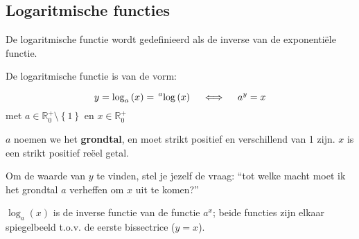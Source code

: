 

\subsection{Logaritmische functies}


\begin{definitie}
	De logaritmische functie wordt gedefinieerd als de inverse
van de exponenti\"ele functie.

De logaritmische functie is van de vorm:

\begin{equation}
 y=\log_{a}\left(x\right)=\sideset{^{a}}{\left(x\right)}\log\quad\iff\quad a^{y}=x
\end{equation}
met $a\in\mathbb{R}_{0}^{+}\setminus\left\{ 1\right\}$
en $x\in\mathbb{R}_{0}^{+}$

$a$ noemen we het \textbf{grondtal}, en moet strikt positief
en verschillend van 1 zijn. $x$ is een strikt positief re\"eel getal.
\end{definitie}


Om de waarde van $y$ te vinden, stel je jezelf de vraag: ``tot
welke macht moet ik het grondtal $a$ verheffen om $x$ uit te komen?''



$\log_{a}(x)$ is de inverse functie van
de functie $a^{x}$; beide functies zijn elkaar spiegelbeeld
t.o.v. de eerste bissectrice ($y=x$).

